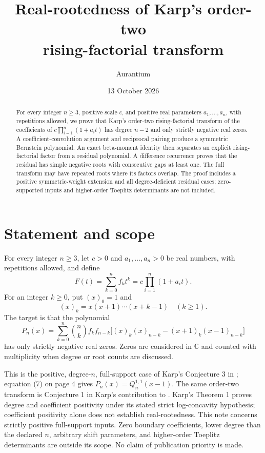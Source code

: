 \documentclass[11pt,a4paper]{article}
\title{Real-rootedness of Karp's order-two\\rising-factorial transform}
\author{Aurantium}
\date{13 October 2026}
\begin{document}
\maketitle
\begin{abstract}
For every integer \(n\geq3\), positive scale \(c\), and positive real
parameters \(a_1,\ldots,a_n\), with repetitions allowed, we prove that
Karp's order-two rising-factorial transform of the coefficients of
\(c\prod_{i=1}^n(1+a_i t)\) has degree \(n-2\) and only strictly negative
real zeros. A coefficient-convolution argument and reciprocal pairing
produce a symmetric Bernstein polynomial. An exact beta-moment identity
then separates an explicit rising-factorial factor from a residual
polynomial. A difference recurrence proves that the residual has simple
negative roots with consecutive gaps at least one. The full transform may
have repeated roots where its factors overlap. The proof includes a
positive symmetric-weight extension and all degree-deficient residual
cases; zero-supported inputs and higher-order Toeplitz determinants are
not included.
\end{abstract}
\section*{Statement and scope}

For every integer \(n\geq3\), let \(c>0\) and \(a_1,\ldots,a_n>0\) be real numbers, with repetitions allowed, and define \[
 F(t)=\sum_{k=0}^n f_k t^k=c\prod_{i=1}^n(1+a_i t).
\] For an integer \(k\geq0\), put \((x)_0=1\) and \[
 (x)_k=x(x+1)\cdots(x+k-1)\quad(k\geq1).
\] The target is that the polynomial \[
 P_n(x)=\sum_{k=0}^n\binom nk f_kf_{n-k}
 \big[(x)_k(x)_{n-k}-(x+1)_k(x-1)_{n-k}\big]
 \tag{1}
\] has only strictly negative real zeros. Zeros are considered in \(\mathbb C\) and counted with multiplicity when degree or root counts are discussed.

This is the positive, degree-\(n\), full-support case of Karp's Conjecture 3 in \cite[p.~2]{Karp2012}; equation (7) on page 4 gives \(P_n(x)=Q_n^{1,1}(x-1)\). The same order-two transform is Conjecture 1 in Karp's contribution to \cite[p.~3]{Kryvonos2023}. Karp's Theorem 1 proves degree and coefficient positivity under its stated strict log-concavity hypothesis; coefficient positivity alone does not establish real-rootedness. This note concerns strictly positive full-support inputs. Zero boundary coefficients, lower degree than the declared \(n\), arbitrary shift parameters, and higher-order Toeplitz determinants are outside its scope. No claim of publication priority is made.
\end{document}
